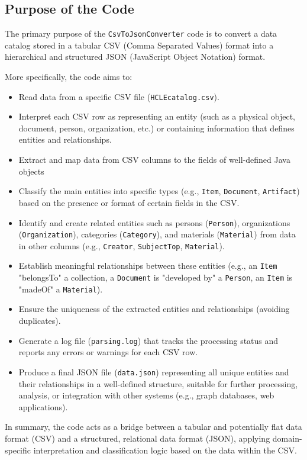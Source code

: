 \subsection{Purpose of the Code}
The primary purpose of the \texttt{CsvToJsonConverter} code is to convert a data catalog stored in a tabular CSV (Comma Separated Values) format into a hierarchical and structured JSON (JavaScript Object Notation) format.

More specifically, the code aims to:
\begin{itemize}
    \item Read data from a specific CSV file (\texttt{HCLEcatalog.csv}).
    \item Interpret each CSV row as representing an entity (such as a physical object, document, person, organization, etc.) or containing information that defines entities and relationships.
    \item Extract and map data from CSV columns to the fields of well-defined Java objects
    \item Classify the main entities into specific types (e.g., \texttt{Item}, \texttt{Document}, \texttt{Artifact}) based on the presence or format of certain fields in the CSV.
    \item Identify and create related entities such as persons (\texttt{Person}), organizations (\texttt{Organization}), categories (\texttt{Category}), and materials (\texttt{Material}) from data in other columns (e.g., \texttt{Creator}, \texttt{SubjectTop}, \texttt{Material}).
    \item Establish meaningful relationships between these entities (e.g., an \texttt{Item} "belongsTo" a collection, a \texttt{Document} is "developed by" a \texttt{Person}, an \texttt{Item} is "madeOf" a \texttt{Material}).
    \item Ensure the uniqueness of the extracted entities and relationships (avoiding duplicates).
    \item Generate a log file (\texttt{parsing.log}) that tracks the processing status and reports any errors or warnings for each CSV row.
    \item Produce a final JSON file (\texttt{data.json}) representing all unique entities and their relationships in a well-defined structure, suitable for further processing, analysis, or integration with other systems (e.g., graph databases, web applications).
\end{itemize}
In summary, the code acts as a bridge between a tabular and potentially flat data format (CSV) and a structured, relational data format (JSON), applying domain-specific interpretation and classification logic based on the data within the CSV.

